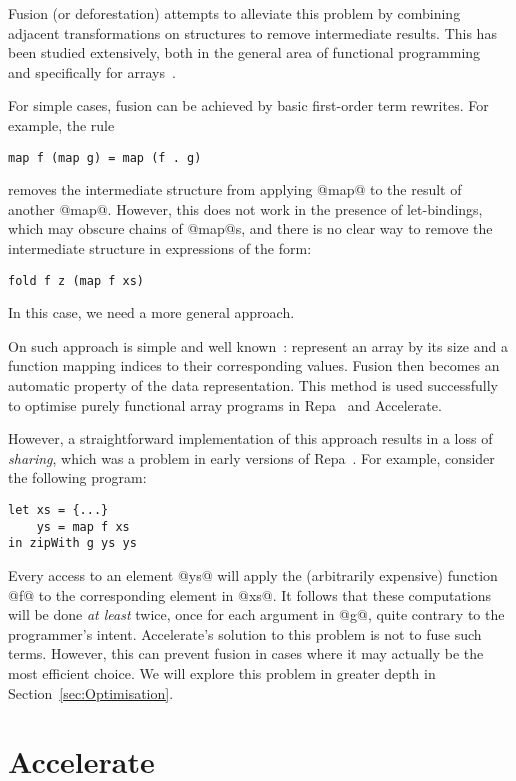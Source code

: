 Fusion (or deforestation) attempts to alleviate this problem by combining adjacent transformations on structures to remove intermediate results. This has been studied extensively, both in the general area of functional programming~\cite{Wadler:1990ix,Meijer:bananas,Gill:1993de,Coutts:stream-fusion} and specifically for arrays~\cite{Chakravarty:array-fusion,Lippmeier:Guiding,McDonell:acc-optim,Lippmeier:flow-fusion}.

For simple cases, fusion can be achieved by basic first-order term rewrites. For example, the rule
%
\begin{lstlisting}
map f (map g) = map (f . g)
\end{lstlisting}
%
removes the intermediate structure from applying @map@ to the result of another @map@. However, this does not work in the presence of let-bindings, which may obscure chains of @map@s, and there is no clear way to remove the intermediate structure in expressions of the form:
%
\begin{lstlisting}
fold f z (map f xs)
\end{lstlisting}
%
In this case, we need a more general approach.

On such approach is simple and well known~\cite{Claessen:obsidian-expressive,Guibas:1978jh,Elliott:2003ug}: represent an array by its size and a function mapping indices to their corresponding values. Fusion then becomes an automatic property of the data representation. This method is used successfully to optimise purely functional array programs in Repa~\cite{Keller:Repa,Lippmeier:Guiding} and Accelerate.

However, a straightforward implementation of this approach results in a loss of \emph{sharing}, which was a problem in early versions of Repa~\cite{Lippmeier:Guiding}. For example, consider the following program:
%
\begin{lstlisting}
let xs = {...}
    ys = map f xs
in zipWith g ys ys
\end{lstlisting}
%
Every access to an element @ys@ will apply the (arbitrarily expensive) function @f@ to the corresponding element in @xs@. It follows that these computations will be done \emph{at least} twice, once for each argument in @g@, quite contrary to the programmer's intent. Accelerate's solution to this problem is not to fuse such terms. However, this can prevent fusion in cases where it may actually be the most efficient choice. We will explore this problem in greater depth in Section~\ref{sec:Optimisation}.

\section{Accelerate}
\label{sec:background-accelerate}

